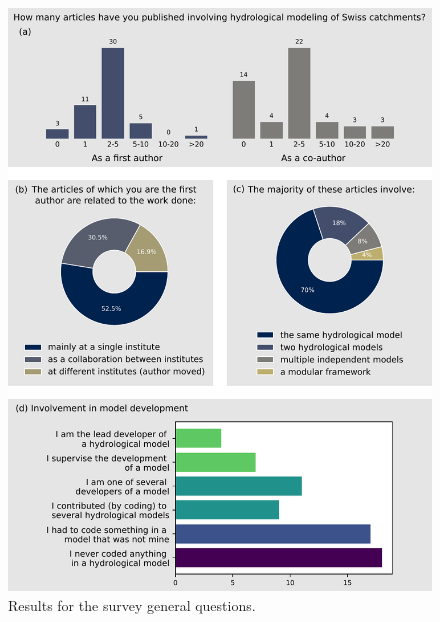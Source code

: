\documentclass[10pt,a4paper]{article}
\begin{document}
\begin{figure}[htbp]
	\begin{center}
		\includegraphics[width=0.95\columnwidth]{figures/survey_general.pdf}
		\caption{{Results for the survey general questions.
		{\label{fig:survey_general}}
		}}
	\end{center}
\end{figure}
\end{document}
